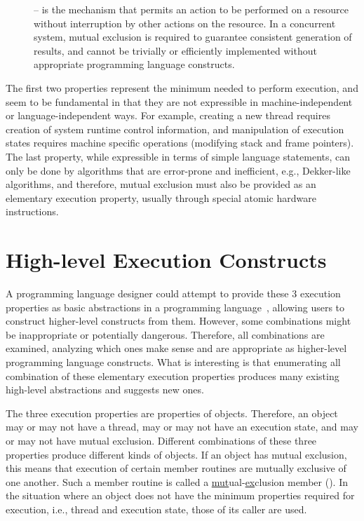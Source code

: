 \documentclass[openright,twoside]{report}
\begin{document}
\begin{description}
\item[] --
is the mechanism that permits an action to be performed on a resource without interruption by other actions on the resource.
In a concurrent system, mutual exclusion is required to guarantee consistent generation of results, and cannot be trivially or efficiently implemented without appropriate programming language constructs.
\end{description}
The first two properties represent the minimum needed to perform execution, and seem to be fundamental in that they are not expressible in machine-independent or language-independent ways.
For example, creating a new thread requires creation of system runtime control information, and manipulation of execution states requires machine specific operations (modifying stack and frame pointers).
The last property, while expressible in terms of simple language statements, can only be done by algorithms that are error-prone and inefficient, e.g., Dekker-like algorithms, and therefore, mutual exclusion must also be provided as an elementary execution property, usually through special atomic hardware instructions.


\section{High-level Execution Constructs}

A programming language designer could attempt to provide these 3 execution properties as basic abstractions in a programming language~\cite{PRESTO}, allowing users to construct higher-level constructs from them.
However, some combinations might be inappropriate or potentially dangerous.
Therefore, all combinations are examined, analyzing which ones make sense and are appropriate as higher-level programming language constructs.
What is interesting is that enumerating all combination of these elementary execution properties produces many existing high-level abstractions and suggests new ones.

The three execution properties are properties of objects.
Therefore, an object may or may not have a thread, may or may not have an execution state, and may or may not have mutual exclusion.
Different combinations of these three properties produce different kinds of objects.
If an object has mutual exclusion, this means that execution of certain member routines are mutually exclusive of one another.
Such a member routine is called a \underline{mut}ual-\underline{ex}clusion member ().
In the situation where an object does not have the minimum properties required for execution, i.e., thread and execution state, those of its caller are used.
\end{document}
